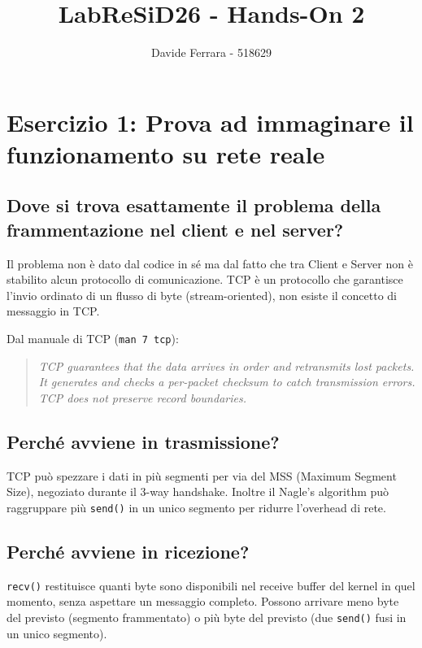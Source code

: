 \documentclass[a4paper,12pt]{article}
\title{LabReSiD26 - Hands-On 2}
\author{Davide Ferrara - 518629}
\date{}
\begin{document}
\maketitle

\section{Esercizio 1: Prova ad immaginare il funzionamento su rete reale}

\subsection{Dove si trova esattamente il problema della frammentazione nel client e nel server?}
Il problema non è dato dal codice in sé ma dal fatto che tra Client e Server non è stabilito
alcun protocollo di comunicazione. TCP è un protocollo che garantisce l'invio ordinato di un
flusso di byte (stream-oriented), non esiste il concetto di messaggio in TCP.

Dal manuale di TCP (\texttt{man 7 tcp}):

\begin{quote}
\textit{TCP guarantees that the data arrives in order and retransmits lost packets.
It generates and checks a per-packet checksum to catch transmission errors.
TCP does not preserve record boundaries.}
\end{quote}

\subsection{Perché avviene in trasmissione?}

TCP può spezzare i dati in più segmenti per via del MSS (Maximum Segment Size),
negoziato durante il 3-way handshake. Inoltre il Nagle's algorithm può raggruppare
più \texttt{send()} in un unico segmento per ridurre l'overhead di rete.

\subsection{Perché avviene in ricezione?}

\texttt{recv()} restituisce quanti byte sono disponibili nel receive buffer del kernel
in quel momento, senza aspettare un messaggio completo. Possono arrivare meno byte
del previsto (segmento frammentato) o più byte del previsto (due \texttt{send()} fusi
in un unico segmento).
\end{document}
